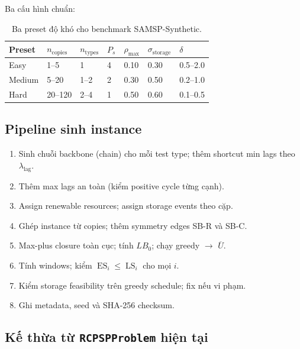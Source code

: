 \documentclass[11pt,a4paper]{article}
\theoremstyle{remark}
\newcommand{\ES}{\operatorname{ES}}
\newcommand{\LS}{\operatorname{LS}}
\begin{document}
Ba cấu hình chuẩn:

\begin{table}[htbp]
\centering
\caption{Ba preset độ khó cho benchmark SAMSP-Synthetic.}
\label{tab:presets}
\begin{tabularx}{\textwidth}{@{}p{}ZZZZZZ@{}}
\toprule
\textbf{Preset} & $n_\mathrm{copies}$ & $n_\mathrm{types}$
  & $P_s$ & $\rho_\mathrm{max}$ & $\sigma_\mathrm{storage}$ & $\delta$\\
\midrule
Easy   & 1--5   & 1   & 4   & 0.10 & 0.30 & 0.5--2.0\\
Medium & 5--20  & 1--2 & 2  & 0.30 & 0.50 & 0.2--1.0\\
Hard   & 20--120 & 2--4 & 1 & 0.50 & 0.60 & 0.1--0.5\\
\bottomrule
\end{tabularx}
\end{table}

\subsection{Pipeline sinh instance}

\begin{enumerate}
  \item Sinh chuỗi backbone (chain) cho mỗi test type;
    thêm shortcut min lags theo $\lambda_\mathrm{lag}$.
  \item Thêm max lags an toàn (kiểm positive cycle từng cạnh).
  \item Assign renewable resources; assign storage events theo cặp.
  \item Ghép instance từ copies; thêm symmetry edges SB-R và SB-C.
  \item Max-plus closure toàn cục; tính $LB_0$; chạy greedy $\to$ $\overline{U}$.
  \item Tính windows; kiểm $\ES_i \le \LS_i$ cho mọi $i$.
  \item Kiểm storage feasibility trên greedy schedule; fix nếu vi phạm.
  \item Ghi metadata, seed và SHA-256 checksum.
\end{enumerate}

\subsection{Kế thừa từ \texttt{RCPSPProblem} hiện tại}
\end{document}
